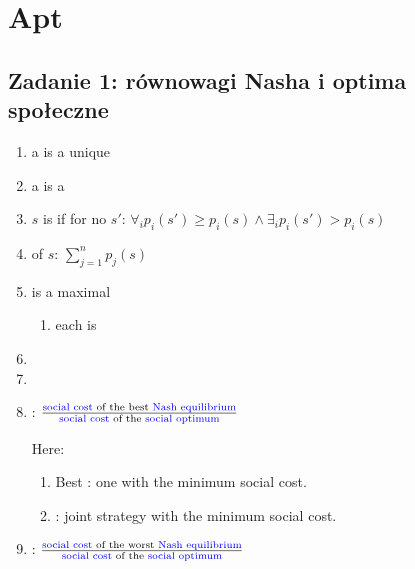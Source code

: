 \section{Apt}

\subsection{Zadanie 1: równowagi Nasha i optima społeczne}

\begin{enumerate}

  \item a
    is a unique

  \item
    a
    is a

  \item
    $s$ is
    if for no $s'$:
    $
    \forall_i p_i(s') \geq p_i(s)
    \wedge
    \exists_i p_i(s') > p_i(s)
    $

  \item
    of $s$: $\sum^n_{j=1}p_j(s)$

  \item
    is a maximal

    \begin{enumerate}
      \item
        each
        is
    \end{enumerate}

  \item

  \item

  \item
    :
    $\frac{\text{{\color{blue}{social cost}} of the best {\color{blue}{Nash equilibrium}}}}{\text{{\color{blue}{social cost}} of the {\color{blue}{social optimum}}}}$

    Here:
    \begin{enumerate}
      \item
        Best : one with the minimum social cost.
      \item
        : joint strategy with the minimum social cost.
    \end{enumerate}

  \item
    :
    $\frac{\text{{\color{blue}{social cost}} of the worst {\color{blue}{Nash equilibrium}}}}{\text{{\color{blue}{social cost}} of the {\color{blue}{social optimum}}}}$

\end{enumerate}

